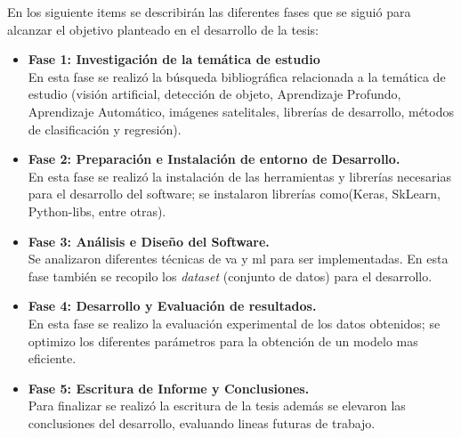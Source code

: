 En los siguiente items se describirán las diferentes fases que se siguió para alcanzar el objetivo planteado en el desarrollo de la tesis:
\begin{itemize}
	\item \textbf{Fase 1: Investigación de la temática de estudio}\\
	En esta fase se realizó la búsqueda bibliográfica relacionada a la temática de estudio (visión artificial, detección de objeto, 
	Aprendizaje Profundo, Aprendizaje Automático, imágenes satelitales, librerías de desarrollo, métodos de clasificación y regresión).
	\item \textbf{Fase 2: Preparación e Instalación de entorno de Desarrollo.}\\
	En esta fase se realizó la instalación de las herramientas y librerías necesarias para el desarrollo del software; se instalaron librerías  
como(Keras, SkLearn, Python-libs, entre otras).
	\item \textbf{Fase 3: Análisis e Diseño del Software.}\\
	Se analizaron diferentes técnicas de \ac{va} y \ac{ml} para ser implementadas. En esta fase también se recopilo los \textit{dataset} (conjunto de datos) para el desarrollo.
	\item \textbf{Fase 4: Desarrollo y Evaluación de resultados.}\\
	En esta fase se realizo la evaluación experimental de los datos obtenidos; se optimizo los diferentes parámetros para la obtención de un 
modelo mas eficiente.
	\item \textbf{Fase 5: Escritura de Informe y Conclusiones.}\\
	Para finalizar se realizó la escritura de la tesis además se elevaron las conclusiones del desarrollo, evaluando lineas futuras de trabajo.
\end{itemize}


